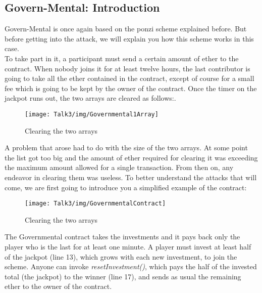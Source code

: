 \subsection{Govern-Mental: Introduction}
Govern-Mental is once again based on the ponzi scheme explained before. But before getting into the attack, we will explain you how this scheme works in this case.\\
To take part in it, a participant must send a  certain amount of ether to the contract. When nobody joins it for at least twelve hours, the last contributor is going to take all the ether contained in the contract, except of course for a small fee which is going to be kept by the owner of the contract.
Once the timer on the jackpot runs out, the two arrays are cleared as follows:\cite{paper2}.
\begin{figure}[H]
\begin{center}
\texttt{[image: Talk3/img/Governmental1Array]}
\end{center}
\caption{Clearing the two arrays}
\label{label}
\end{figure}
A problem that arose had to do with the size of the two arrays. At some point the list got too big and the amount of ether required for clearing it was exceeding the maximum amount allowed for a single transaction. From then on, any endeavor in clearing them was useless.
To better understand the attacks that will come, we are first going to introduce you a simplified example of the contract:
\begin{figure}[H]
\begin{center}
\texttt{[image: Talk3/img/GovernmentalContract]}
\end{center}
\caption{Clearing the two arrays}
\label{label}
\end{figure}
The Governmental contract takes the investments and it pays back only the player who is the last for at least one minute. A player must invest at least half of the jackpot (line 13), which grows with each new investment, to join the scheme. Anyone can invoke \textit{resetInvestment()}, which pays the half of the invested total (the jackpot) to the winner (line 17), and sends as usual the remaining ether to the owner of the contract.
